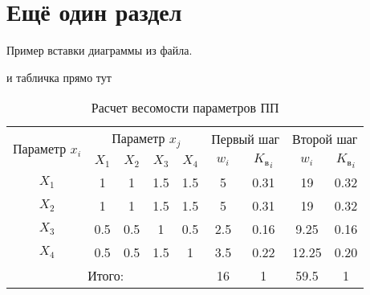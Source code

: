 \section{Ещё один раздел}

Пример вставки диаграммы из файла.


и табличка прямо тут

\begin{table}[ht]
  \caption{Расчет весомости параметров ПП}
  \label{tab_weight}
  \centering
      \begin{tabular}{|c|c|c|c|c|c|c|c|c|}
      \hline \multirow{2}{*}{Параметр $x_i$} & \multicolumn{4}{c|}{Параметр $x_j$} &
          \multicolumn{2}{c|}{Первый шаг} & \multicolumn{2}{c|}{Второй шаг} \\
      \cline{2-9} & $X_1$ & $X_2$ & $X_3$ & $X_4$ & $w_i$ &
          ${K_\text{в}}_i$ & $w_i$ & ${K_\text{в}}_i$ \\
      \hline $X_1$ & 1 & 1 & 1.5 & 1.5 & 5 & 0.31 & 19 & 0.32 \\
      \hline $X_2$ & 1 & 1 & 1.5 & 1.5 & 5 & 0.31 & 19 & 0.32 \\
      \hline $X_3$ & 0.5 & 0.5 & 1 & 0.5 & 2.5 & 0.16 & 9.25 & 0.16 \\
      \hline $X_4$ & 0.5 & 0.5 & 1.5 & 1 & 3.5 & 0.22 & 12.25 & 0.20 \\
      \hline \multicolumn{5}{|c|}{Итого:} & 16 & 1 & 59.5 & 1 \\
      \hline
      \end{tabular}
  \end{table}
